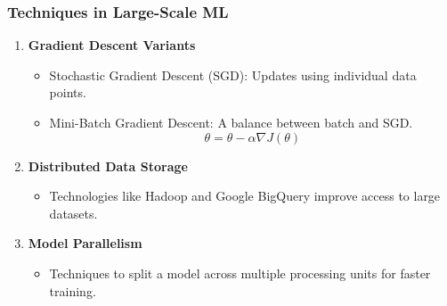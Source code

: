\documentclass[aspectratio=169]{beamer}
\begin{document}
\begin{frame}[fragile]
    \frametitle{Techniques in Large-Scale ML}
    \begin{enumerate}
        \item \textbf{Gradient Descent Variants}
            \begin{itemize}
                \item Stochastic Gradient Descent (SGD): Updates using individual data points.
                \item Mini-Batch Gradient Descent: A balance between batch and SGD. 
                \begin{equation}
                    \theta = \theta - \alpha \nabla J(\theta)
                \end{equation}
            \end{itemize}
            
        \item \textbf{Distributed Data Storage}
            \begin{itemize}
                \item Technologies like Hadoop and Google BigQuery improve access to large datasets.
            \end{itemize}
            
        \item \textbf{Model Parallelism}
            \begin{itemize}
                \item Techniques to split a model across multiple processing units for faster training.
            \end{itemize}
    \end{enumerate}
\end{frame}
\end{document}

